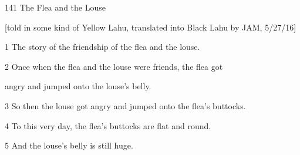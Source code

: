 
{141 The Flea and the Louse}

{[told in some kind of Yellow Lahu, translated into Black Lahu by JAM, 5/27/16]}

{1 The story of the friendship of the flea and the louse.}

{2  Once when the flea and the louse were friends, the flea got     }

{angry and jumped onto the louse's belly.}

{3  So then the louse got angry and jumped onto the flea's buttocks.}

{4  To this very day, the flea's buttocks are flat and round.}

{5  And the louse's belly is still huge.}


